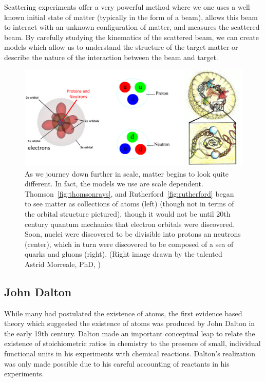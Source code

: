 Scattering experiments offer a very powerful method where we one uses a well
known initial state of matter (typically in the form of a beam), allows this
beam to interact with an unknown configuration of matter, and measures the
scattered beam. By carefully studying the kinematics of the scattered beam, we
can create models which allow us to understand the structure of the target
matter or describe the nature of the interaction between the beam and target. 

\begin{figure}[ht]
	\centering
	\includegraphics[width=\linewidth]{./figures/scale_of_matter.png}
	\caption{
		As we journey down further in scale, matter begins to look quite different.
		In fact, the models we use are scale dependent.
		Thomson~\ref{fig:thomsonrays}, and Rutherford~\ref{fig:rutherford} began to
		see matter as collections of atoms (left)  \cite{Freudenrich2001} (though
		not in terms of the orbital structure pictured), though it would not be
		until 20th century quantum mechanics that electron orbitals were
		discovered.  Soon, nuclei were discovered to be divisible into protons an
		neutrons  \cite{Manisearth2010} (center), which in turn were discovered to
		be composed of a sea of quarks and gluons (right). (Right image drawn by
		the talented Astrid Morreale, PhD,  \cite{Morreale2009})
	}
	\label{fig:scale_of_matter}
\end{figure}

\subsection{John Dalton}

While many had postulated the existence of atoms, the first evidence based
theory which suggested the existence of atoms was produced by John Dalton in the
early 19th century. Dalton made an important conceptual leap to relate the
existence of stoichiometric ratios in chemistry to the presence of small,
individual functional units in his experiments with chemical reactions.
Dalton's realization was only made possible due to his careful accounting of
reactants in his experiments.


